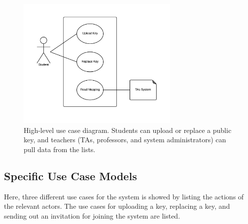 \documentclass[11pt,a4paper]{report}
\begin{document}
\begin{figure}[H]
\centering
\includegraphics[width=0.7\textwidth]{pictures/use_case_pksu_del2_b_high}
\caption{High-level use case diagram. Students can upload or replace a public key, and teachers (TAs, professors, and system administrators) can pull data from the lists.}
\label{fig:use_case_diagram_high_level}
\end{figure}


\subsection{Specific Use Case Models}\label{subsec:Specific_Use_case_model}
Here, three different use cases for the system is showed by listing the actions of the relevant actors. The use cases for uploading a key, replacing a key, and sending out an invitation for joining the system are listed.
\end{document}
